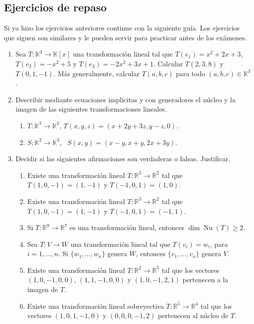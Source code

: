\subsection*{Ejercicios de repaso}
Si ya hizo los ejercicios anteriores continue con la siguiente guía. Los ejercicios que siguen son similares y le pueden servir para practicar antes de los exámenes.

\begin{enumerate}[resume, topsep=5pt,itemsep=.4cm]
  \item Sea $T: \mathbb{K}^3\longrightarrow\mathbb{K}[x]$ una transformación lineal tal que $T(e_1)=x^2+2x+3$, $T(e_2)=-x^2+5$ y $T(e_3)=-2x^2+3x+1$. Calcular $T(2,3,8)$ y $T(0,1,-1)$. Más generalmente, calcular $T(a,b,c)$ para todo $(a,b,c)\in\mathbb{K}^3$.
  
  \item Describir mediante ecuaciones implícitas y con generadores  el núcleo y la imagen de  las siguientes transformaciones lineales.
\begin{enumerate}[topsep=5pt,itemsep=5pt]
 \item $T:\mathbb{K}^3\longrightarrow\mathbb{K}^3$, $T(x,y,z)=(x+2y+3z, y-z,0)$.
 \item $S:\mathbb{K}^2 \longrightarrow \mathbb{K}^3$, \ $S(x,y)=(x-y,x+y,2x+3y)$.
\end{enumerate}    


\item Decidir si las siguientes afirmaciones son verdaderas o falsas. Justificar.

\begin{enumerate}
\item Existe una transformación lineal $T : \mathbb R^3 \to \mathbb R^2$ tal que $T(1, 0,-1) = (1, -1)$ y $T(-1, 0, 1) = (1, 0)$.
\item Existe una transformación lineal $T : \mathbb R^3 \to \mathbb R^2$ tal que $T(1, 0,-1) = (1, -1)$ y $T(-1, 0, 1) = (-1, 1)$.
\item  Si $T : \mathbb R^9 \to \mathbb R^7$ es una transformación lineal, entonces $\dim \operatorname{Nu}(T) \geq  2$.
\item Sea $T : V \to W$ una transformación lineal tal que $T(v_i) = w_i$, para $i = 1, \dots , n$. Si $\{w_1, \dots , w_n\}$ genera $W$, entonces
$\{v_1, \dots , v_n\}$ genera $V$.
\item Existe una transformación lineal $T : \mathbb R^2 \to \mathbb R^5$ tal que los vectores $(1, 0, -1, 0, 0)$, $(1, 1, -1, 0, 0)$ y $(1, 0, -1, 2, 1)$ pertenecen a la imagen de $T$.
\item Existe una transformación lineal sobreyectiva $T : \mathbb R^5 \to \mathbb R^4$ tal que los vectores $(1, 0, 1, -1, 0)$ y $(0, 0, 0, -1, 2)$
pertenecen al núcleo de $T$.
\end{enumerate}


\end{enumerate}
